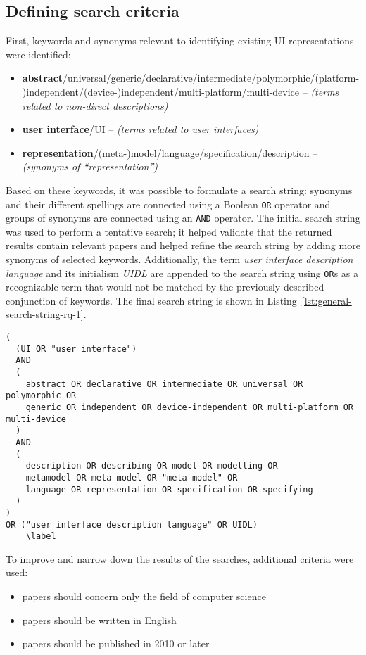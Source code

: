 \subsection{Defining search criteria}\label{subsec:defining-search-criteria}
First, keywords and synonyms relevant to identifying existing UI representations were identified:
\begin{itemize}
    \item \textbf{abstract}/universal/generic/declarative/intermediate/polymorphic/(platform-)independent/(device-)independent/multi-platform/multi-device -- \textit{(terms related to non-direct descriptions)}
    \item \textbf{user interface}/UI -- \textit{(terms related to user interfaces)}
    \item \textbf{representation}/(meta-)model/language/specification/description -- \textit{(synonyms of \enquote{representation})}
\end{itemize}
Based on these keywords, it was possible to formulate a search string: synonyms and their different spellings are connected using a Boolean \texttt{OR} operator and groups of synonyms are connected using an \texttt{AND} operator.
The initial search string was used to perform a tentative search;
it helped validate that the returned results contain relevant papers and helped refine the search string by adding more synonyms of selected keywords.
Additionally, the term \emph{user interface description language} and its initialism \emph{UIDL} are appended to the search string using \texttt{OR}s as a recognizable term that would not be matched by the previously described conjunction of keywords.
The final search string is shown in Listing~\ref{lst:general-search-string-rq-1}.
\begin{lstlisting}[label=lst:general-search-string-rq-1,caption=The search string, basicstyle=\ttfamily]
(
  (UI OR "user interface")
  AND
  (
    abstract OR declarative OR intermediate OR universal OR polymorphic OR
    generic OR independent OR device-independent OR multi-platform OR multi-device
  )
  AND
  (
    description OR describing OR model OR modelling OR
    metamodel OR meta-model OR "meta model" OR
    language OR representation OR specification OR specifying
  )
)
OR ("user interface description language" OR UIDL)
    \label
\end{lstlisting}

To improve and narrow down the results of the searches, additional criteria were used:
\begin{samepage}
\begin{itemize}
    \item papers should concern only the field of computer science
    \item papers should be written in English
    \item papers should be published in 2010 or later
\end{itemize}
\end{samepage}

